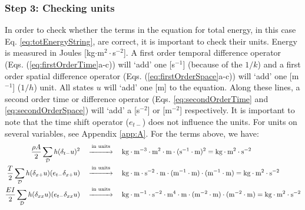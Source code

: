 \documentclass{article}
\begin{document}
\subsubsection*{Step 3: Checking units}
In order to check whether the terms in the equation for total energy, in this case Eq. \eqref{eq:totEnergyString}, are correct, it is important to check their units. Energy is measured in Joules [kg$\cdot$m$^2\cdot$s$^{-2}$]. A first order temporal difference operator (Eqs. (\ref{eq:firstOrderTime}a-c)) will `add' one [s$^{-1}$] (because of the $1/k$) and a first order spatial difference operator (Eqs. (\ref{eq:firstOrderSpace}a-c)) will `add' one [m$^{-1}$] ($1/h$) unit. All states $u$ will `add' one [m] to the equation. Along these lines, a second order time or difference operator (Eqs. \eqref{eq:secondOrderTime} and \eqref{eq:secondOrderSpace}) will `add' a [s$^{-2}$] or [m$^{-2}$] respectively. It is important to note that the time shift operator ($e_{t-}$) does not influence the units. For units on several variables, see Appendix \ref{app:A}. For the terms above, we have:
\begin{subequations}
\begin{align}
\frac{\rho A}{2}\sum_\mathcal{D}h(\delta_{t-}u)^2 \quad
&\overset{\text{in units}}{\xrightarrow{\hspace*{1cm}}}    \quad\text{kg}\cdot\text{m}^{-3}\cdot\text{m}^2\cdot\text{m}\cdot(\text{s}^{-1}\cdot\text{m})^2 = \text{kg}\cdot\text{m}^2\cdot\text{s}^{-2}\\
\frac{T}{2}\sum_\mathcal{D}h (\delta_{x+}u)( e_{t-}\delta_{x+}u) \quad
&\overset{\text{in units}}{\xrightarrow{\hspace*{1cm}}}    \quad\text{kg}\cdot\text{m}\cdot\text{s}^{-2}\cdot\text{m}\cdot(\text{m}^{-1}\cdot\text{m})\cdot(\text{m}^{-1}\cdot\text{m}) = \text{kg}\cdot\text{m}^2\cdot\text{s}^{-2}\\
\frac{EI}{2}\sum_\mathcal{D}h (\delta_{xx}u)( e_{t-}\delta_{xx}u) \quad
&\overset{\text{in units}}{\xrightarrow{\hspace*{1cm}}}    \quad\text{kg}\cdot\text{m}^{-1}\cdot\text{s}^{-2}\cdot\text{m}^4\cdot\text{m}\cdot(\text{m}^{-2}\cdot\text{m})\cdot(\text{m}^{-2}\cdot\text{m}) = \text{kg}\cdot\text{m}^2\cdot\text{s}^{-2}
\end{align}
\end{subequations}
\end{document}

